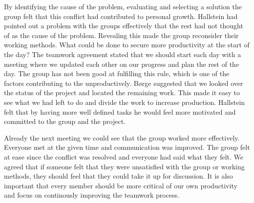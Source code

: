 By identifying the cause of the problem, evaluating and selecting a solution the group felt that this conflict had contributed to personal growth. Hallstein had pointed out a problem with the groups effectively that the rest had not thought of as the cause of the problem. Revealing this made the group reconsider their working methods. What could be done to secure more productivity at the start of the day? The teamwork agreement stated that we should start each day with a meeting where we updated each other on our progress and plan the rest of the day. The group has not been good at fulfilling this rule, which is one of the factors contributing to the unproductively. Børge suggested that we looked over the status of the project and located the remaining work. This made it easy to see what we had left to do and divide the work to increase production. Hallstein felt that by having more well defined tasks he would feel more motivated and committed to the group and the project.  

Already the next meeting we could see that the group worked more effectively. Everyone met at the given time and communication was improved. The group felt at ease since the conflict was resolved and everyone had said what they felt. We agreed that if someone felt that they were unsatisfied with the group or working methods, they should feel that they could take it up for discussion. It is also important that every member should be more critical of our own productivity and focus on continously improving the teamwork process.  

